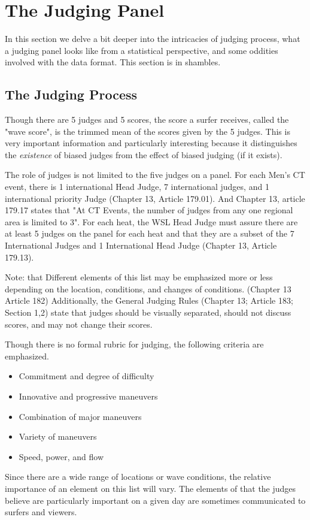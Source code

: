 \documentclass{article}
\theoremstyle{definition}
\begin{document}
\section{The Judging Panel}
In this section we delve a bit deeper into the intricacies of judging process, what a judging panel looks like from a statistical perspective, and some oddities involved with the data format. This section is in shambles.

\subsection{The Judging Process}
Though there are 5 judges and 5 scores, the score a surfer receives, called the "wave score", is the trimmed mean of the scores given by the 5 judges. This is very important information and particularly interesting because it distinguishes the \textit{existence} of biased judges from the effect of biased judging (if it exists).

The role of judges is not limited to the five judges on a panel. For each Men's CT event, there is 1 international Head Judge, 7 international judges, and 1 international priority Judge (Chapter 13, Article 179.01). And Chapter 13, article 179.17 states that "At CT Events, the number of judges from any one regional area is limited to 3". For each heat, the WSL Head Judge must assure there are at least 5 judges on the panel for each heat and that they are a subset of the 7 International Judges and 1 International Head Judge (Chapter 13, Article 179.13).

Note: that Different elements of this list may be emphasized more or less depending on the location, conditions, and changes of conditions. (Chapter 13 Article 182) Additionally, the General Judging Rules (Chapter 13; Article 183; Section 1,2) state that judges should be visually separated, should not discuss scores, and may not change their scores.

Though there is no formal rubric for judging, the following criteria are emphasized.
\begin{itemize}
\item Commitment and degree of difficulty
\item Innovative and progressive maneuvers
\item Combination of major maneuvers
\item Variety of maneuvers
\item Speed, power, and flow
\end{itemize}
Since there are a wide range of locations or wave conditions, the relative importance of an element on this list will vary. The elements of that the judges believe are particularly important on a given day are sometimes communicated to surfers and viewers.
\end{document}

